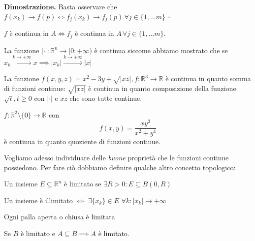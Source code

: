 \noindent \textbf{Dimostrazione. }
Basta osservare che $f(x_k) \to f(p) \iff f_j(x_k) \to f_j(p) \, \forall j \in \{1, \ldots m \}$
\hfill $\square$

\begin{remark}
$f$ è continua in $A \iff f_j$ è continua in $A \, \forall j \in \{1, \ldots m \}$.
\end{remark}

\vspace{0.5cm}
\begin{example}
La funzione $|\cdot|: \mathbb{R}^n \to [0; +\infty)$ è continua siccome abbiamo mostrato che se $x_k \stackrel{k \to +\infty}{\to} x \implies |x_k| \stackrel{k \to +\infty}{\to} |x|$
\end{example}

\vspace{0.5cm}
\begin{example}
	La funzione $f(x, y, z) = x^2 - 3y + \sqrt{|xz|}, f: \mathbb{R}^3 \to \mathbb{R}$ è continua in quanto somma di funzioni continue: $\sqrt{|xz|}$ è continua in quanto composizione della funzione $\sqrt{t}, t \geq 0$ con $|\cdot|$ e $xz$ che sono tutte continue. 
\end{example}

\vspace{0.5cm}
\begin{example}
	$f: \mathbb{R}^2 \setminus \{ 0 \} \to \mathbb{R}$ con 
	$$
	f(x, y) = \frac{xy^3}{x^2 + y^4}
	$$
	è continua in quanto quoziente di funzioni continue.
\end{example}

\vspace{0.5cm}
Vogliamo adesso individuare delle \emph{buone} proprietà che le funzioni continue possiedono. Per fare ciò dobbiamo definire qualche altro concetto topologico:
\vspace{0.5cm}
\begin{definition}
	Un insieme $E \subseteq \mathbb{R}^n$ è limitato se $\exists R > 0 : E \subseteq B(0, R)$
\end{definition}

\begin{remark}
	Un insieme è illimitato $\iff$ $\exists \{x_k\} \in E \, \, \forall k : |x_k| \to +\infty$
\end{remark}

\begin{remark}
	Ogni palla aperta o chiusa è limitata
\end{remark}

\begin{remark}
	Se $B$ è limitato e $A \subseteq B \implies A$ è limitato.
\end{remark}

